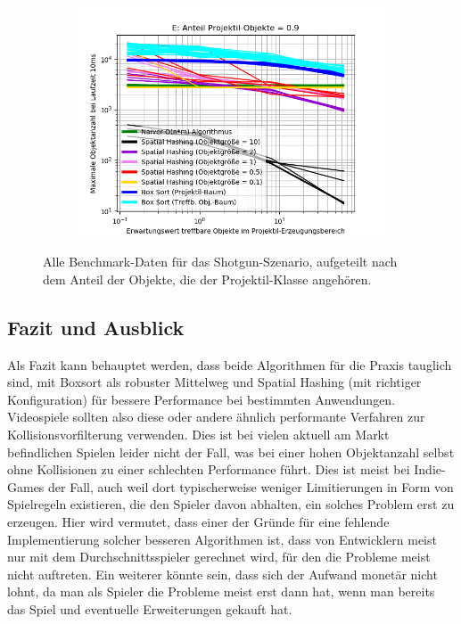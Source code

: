 \begin{figure}
\begin{subfigure}[t]{0.55\textwidth}
		\label{fig:shotgunComparison-D}
	\end{subfigure}
~
	\begin{subfigure}[t]{0.55\textwidth}
		\centering
		\includegraphics[width=1\textwidth]{./res/shotgunComparison-E.png}

		\label{fig:shotgunComparison-E}
	\end{subfigure}

	\caption{Alle Benchmark-Daten für das Shotgun-Szenario, aufgeteilt nach dem Anteil der Objekte, die der Projektil-Klasse angehören.}
	\label{fig:shotgunComparison}
\end{figure}

\subsection{Fazit und Ausblick}
Als Fazit kann behauptet werden, dass beide Algorithmen für die Praxis tauglich sind, mit Boxsort als robuster Mittelweg und  Spatial Hashing (mit richtiger Konfiguration) für bessere Performance bei bestimmten Anwendungen. Videospiele sollten also diese oder andere ähnlich performante Verfahren zur Kollisionsvorfilterung verwenden. Dies ist bei vielen aktuell am Markt befindlichen Spielen leider nicht der Fall, was bei einer hohen Objektanzahl selbst ohne Kollisionen zu einer schlechten Performance führt. Dies ist meist bei Indie-Games der Fall, auch weil dort typischerweise weniger Limitierungen in Form von Spielregeln existieren, die den Spieler davon abhalten, ein solches Problem erst zu erzeugen. Hier wird vermutet, dass einer der Gründe für eine fehlende Implementierung solcher besseren Algorithmen ist, dass von Entwicklern meist nur mit dem Durchschnittsspieler gerechnet wird, für den die Probleme meist nicht auftreten. Ein weiterer könnte sein, dass sich der Aufwand monetär nicht lohnt, da man als Spieler die Probleme meist erst dann hat, wenn man bereits das Spiel und eventuelle Erweiterungen gekauft hat.\\

